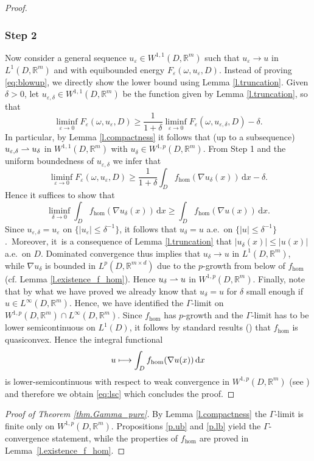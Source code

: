 \documentclass[11pt]{article}
\newcommand{\cf}{cf.\xspace}
\numberwithin{equation}{section}
\def\mto{\mathchoice{\longmapsto}{\mapsto}{\mapsto}{\mapsto}}
\def\harptod{\mathrel{\relbar\joinrel\rightharpoonup}}
\def\harpto{\mathchoice{\harptod}{\rightharpoonup}{\rightharpoonup}{\rightharpoonup}}
\theoremstyle{definition}
\let\e\varepsilon
\let\w\omega
\newcommand{\dx}{\,\mathrm{d}x}
\newcommand{\R}{\mathbb{R}}
\begin{document}
\begin{proof}
\subsubsection*{Step 2} Now consider a general sequence $u_{\e}\in W^{1,1}(D,\R^m)$ such that $u_{\e}\to u$ in $L^1(D,\R^m)$ and with equibounded energy $F_{\e}(\w,u_{\e},D)$. Instead of proving \eqref{eq:blowup}, we directly show the lower bound using Lemma \ref{l.truncation}. Given $\delta>0$, let $u_{\e,\delta}\in W^{1,1}(D,\R^m)$ be the function given by Lemma \ref{l.truncation}, so that
\begin{equation*}
\liminf_{\e\to 0}F_{\e}(\w,u_{\e},D)\geq \frac{1}{1+\delta}\liminf_{\e\to 0}F_{\e}(\w,u_{\e,\delta},D)-\delta.
\end{equation*}
In particular, by Lemma \ref{l.compactness} it follows that (up to a subsequence) $u_{\e,\delta}\harpto u_{\delta}$ in $W^{1,1}(D,\R^m)$ with $u_{\delta}\in W^{1,p}(D,\R^m)$. From Step 1 and the uniform boundedness of $u_{\e,\delta}$ we infer that
\begin{equation*}
\liminf_{\e\to 0}F_{\e}(\w,u_{\e},D)\geq \frac{1}{1+\delta}\int_Df_{\hom}(\nabla u_{\delta}(x))\dx-\delta.
\end{equation*}
Hence it suffices to show that
\begin{equation}\label{eq:lsc}
\liminf_{\delta\to 0}\int_D f_{\hom}(\nabla u_{\delta}(x))\dx\geq \int_D f_{\hom}(\nabla u(x))\dx.
\end{equation}
Since $u_{\e,\delta}=u_{\e}$ on $\{|u_{\e}|\leq\delta^{-1}\}$, it follows that $u_{\delta}=u$ a.e.\ on $\{|u|\leq \delta^{-1}\}$.~Moreover, it~is a consequence of Lemma \ref{l.truncation} that $|u_{\delta}(x)|\leq |u(x)|$ a.e.\ on $D$. Dominated convergence thus implies that $u_{\delta}\to u$ in $L^1(D,\R^m)$, while $\nabla u_{\delta}$ is bounded in $L^p(D,\R^{m\times d})$ due to the $p$-growth from below of $f_{\hom}$ (\cf Lemma \ref{l.existence_f_hom}). Hence $u_{\delta}\harpto u$ in $W^{1,p}(D,\R^m)$. Finally, note that by what we have proved we already know that $u_{\delta}=u$ for $\delta$ small enough if $u\in L^{\infty}(D,\R^m)$. Hence, we have identified the $\Gamma$-limit on $W^{1,p}(D,\R^m)\cap L^{\infty}(D,\R^m)$. Since $f_{\hom}$ has $p$-growth and the $\Gamma$-limit has to be lower semicontinuous on $L^1(D)$, it follows by standard results (\cite[Th.\,8.4]{Da}) that $f_{\hom}$ is quasiconvex. Hence the integral functional
\begin{equation*}
u\mto \int_D f_{\hom}(\nabla u(x))\dx
\end{equation*}
is lower-semicontinuous with respect to weak convergence in $W^{1,p}(D,\R^m)$ (see \cite[Th.\,8.11]{Da}) and therefore we obtain \eqref{eq:lsc} which concludes the proof.
\end{proof}
\begin{proof}[Proof of Theorem \ref{thm.Gamma_pure}]
By Lemma \ref{l.compactness} the $\Gamma$-limit is finite only on $W^{1,p}(D,\R^m)$. Propositions \ref{p.ub} and \ref{p.lb} yield the $\Gamma$-convergence statement, while the properties of $f_{\hom}$ are proved in Lemma~\ref{l.existence_f_hom}.
\end{proof}
\end{document}
